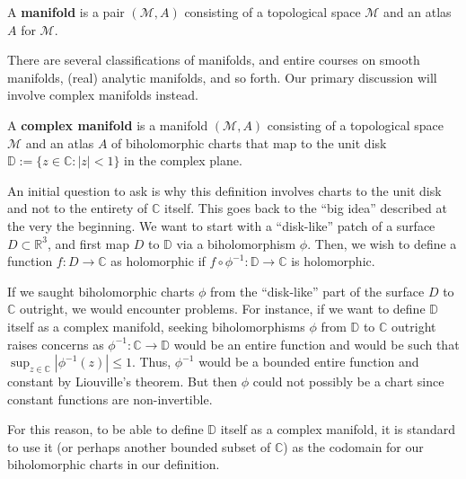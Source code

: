 \begin{definition} A \textbf{\textcolor{myblue}{manifold}} is a pair $(\mathcal{M},A)$ consisting of a topological space $\mathcal{M}$ and an atlas $A$ for $\mathcal{M}$. \end{definition}



There are several classifications of manifolds, and entire courses on smooth manifolds, (real) analytic manifolds, and so forth. Our primary discussion will involve complex manifolds instead.


\begin{definition}A \textbf{\textcolor{myblue}{complex manifold}} is a manifold $(\mathcal{M},A)$ consisting of a topological space $\mathcal{M}$ and an atlas $A$ of biholomorphic charts that map to the unit disk $\mathbb{D}:=\{z\in\mathbb{C}: |z|<1\}$ in the complex plane.\end{definition}

An initial question to ask is why this definition involves charts to the unit disk and not to the entirety of $\mathbb{C}$ itself. This goes back to the ``big idea'' described at the very the beginning. We want to start with a ``disk-like'' patch of a surface $D\subset\mathbb{R}^3$, and first map $D$ to $\mathbb{D}$ via a biholomorphism $\phi$. Then, we wish to define a function $f:D\to\mathbb{C}$ as holomorphic if  $f\circ\phi^{-1}:\mathbb{D}\to\mathbb{C}$ is holomorphic.

If we saught biholomorphic charts $\phi$ from the ``disk-like'' part of the surface $D$ to $\mathbb{C}$ outright, we would encounter problems. For instance, if we want to define $\mathbb{D}$ itself as a complex manifold, seeking biholomorphisms $\phi$ from $\mathbb{D}$ to $\mathbb{C}$ outright raises concerns as $\phi^{-1}:\mathbb{C}\to\mathbb{D}$ would be an entire function and would be such that $\sup_{z\in \mathbb{C}}|\phi^{-1}(z)|\leq 1$. Thus, $\phi^{-1}$ would be a bounded entire function and constant by Liouville's theorem. But then $\phi$ could not possibly be a chart since constant functions are non-invertible.

For this reason, to be able to define $\mathbb{D}$ itself as a complex manifold, it is standard to use it (or perhaps another bounded subset of $\mathbb{C}$) as the codomain for our biholomorphic charts in our definition.

